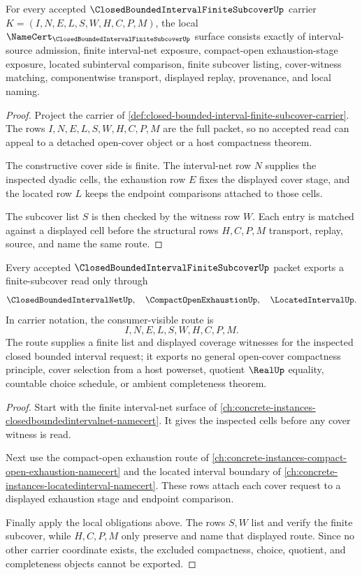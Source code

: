 \begin{theorem}
\label{thm:closed-bounded-interval-finite-subcover-namecert-obligations}
For every accepted $\ClosedBoundedIntervalFiniteSubcoverUp$ carrier $K=(I,N,E,L,S,W,H,C,P,M)$, the local $\NameCert_{\ClosedBoundedIntervalFiniteSubcoverUp}$ surface consists exactly of interval-source admission, finite interval-net exposure, compact-open exhaustion-stage exposure, located subinterval comparison, finite subcover listing, cover-witness matching, componentwise transport, displayed replay, provenance, and local naming.
\end{theorem}
\begin{proof}
Project the carrier of \autoref{def:closed-bounded-interval-finite-subcover-carrier}. The rows $I,N,E,L,S,W,H,C,P,M$ are the full packet, so no accepted read can appeal to a detached open-cover object or a host compactness theorem.

The constructive cover side is finite. The interval-net row $N$ supplies the inspected dyadic cells, the exhaustion row $E$ fixes the displayed cover stage, and the located row $L$ keeps the endpoint comparisons attached to those cells.

The subcover list $S$ is then checked by the witness row $W$. Each entry is matched against a displayed cell before the structural rows $H,C,P,M$ transport, replay, source, and name the same route.
\end{proof}

\begin{theorem}
\label{thm:closed-bounded-interval-finite-subcover-route}
Every accepted $\ClosedBoundedIntervalFiniteSubcoverUp$ packet exports a finite-subcover read only through
$$
\ClosedBoundedIntervalNetUp,\quad \CompactOpenExhaustionUp,\quad \LocatedIntervalUp .
$$
In carrier notation, the consumer-visible route is
$$
I,N,E,L,S,W,H,C,P,M .
$$
The route supplies a finite list and displayed coverage witnesses for the inspected closed bounded interval request; it exports no general open-cover compactness principle, cover selection from a host powerset, quotient $\RealUp$ equality, countable choice schedule, or ambient completeness theorem.
\end{theorem}
\begin{proof}
Start with the finite interval-net surface of \autoref{ch:concrete-instances-closedboundedintervalnet-namecert}. It gives the inspected cells before any cover witness is read.

Next use the compact-open exhaustion route of \autoref{ch:concrete-instances-compact-open-exhaustion-namecert} and the located interval boundary of \autoref{ch:concrete-instances-locatedinterval-namecert}. These rows attach each cover request to a displayed exhaustion stage and endpoint comparison.

Finally apply the local obligations above. The rows $S,W$ list and verify the finite subcover, while $H,C,P,M$ only preserve and name that displayed route. Since no other carrier coordinate exists, the excluded compactness, choice, quotient, and completeness objects cannot be exported.
\end{proof}

